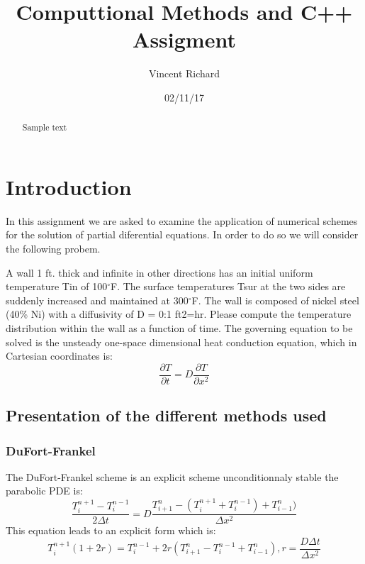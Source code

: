\documentclass [10 pt, a4 paper]{article}
\author{Vincent Richard}
\date{02/11/17}
\title{Computtional Methods and C++ Assigment}
\begin{document}
\begin{titlepage}
    \maketitle
\end{titlepage}
\newpage

\begin{abstract}
    Sample text
\end{abstract}

\tableofcontents
\listoffigures
\listoftables
\newpage


\section{Introduction}

In this assignment we are asked to examine the application of numerical schemes
for the solution of partial diferential equations. In order to  do so we will consider 
the following probem.

A wall 1 ft. thick and infinite in other directions has an initial uniform temperature Tin of 100$^{\circ}$F. The surface temperatures Tsur at the two
sides are suddenly increased and maintained at 300$^{\circ}$F. The wall is composed of
nickel steel (40\% Ni) with a diffusivity of D = 0:1 ft2=hr. Please compute the
temperature distribution within the wall as a function of time.
The governing equation to be solved is the unsteady one-space dimensional
heat conduction equation, which in Cartesian coordinates is:
\begin{equation}
    \frac{\partial T}{\partial t} = D \frac{\partial T}{\partial x^{2}}
\end{equation}

\subsection{Presentation of the different methods used}

\subsubsection{DuFort-Frankel}
The DuFort-Frankel scheme is an explicit scheme unconditionnaly stable the parabolic PDE is:
\begin{equation}
    \frac{T_{i}^{n+1} - T_{i}^{n-1}}{2\Delta t} = D \frac{T_{i+1}^{n} -(T_{i}^{n+1} + T_{i}^{n-1}) + T_{i-1}^{n})}{\Delta x^{2}}
\end{equation}
This equation leads to an explicit form which is:
\begin{equation}
    T_{i}^{n+1}(1 + 2r) = T_{i}^{n-1} +2r(T_{i+1}^{n} - T_{i}^{n-1} + T_{i-1}^{n}), r =\frac{D\Delta t}{\Delta x^{2}}
\end{equation}
\end{document}
